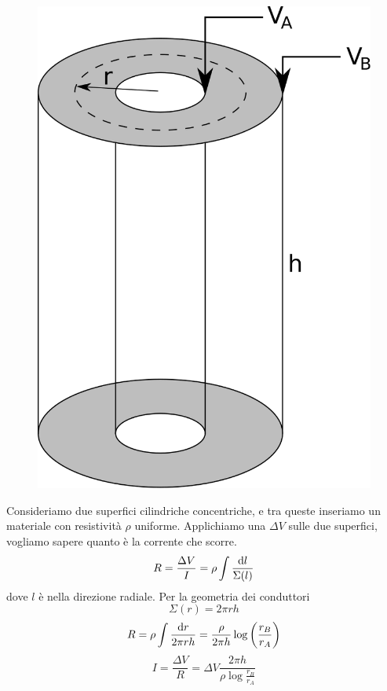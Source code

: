 \begin{Es}
  \begin{figure}[htbp]
    \centering
    \includegraphics[scale=0.35]{immagini/fisica2/conduttore_cilindrico}
  \end{figure}
  Consideriamo due superfici cilindriche concentriche, e tra queste inseriamo un materiale con resistività $\rho$ uniforme. Applichiamo una $\Delta V$ sulle due superfici, vogliamo sapere quanto è la corrente che scorre.
  \[
    R = \frac{\Delta V}{I} = \rho\int\frac{\mathrm{d} l}{\Sigma(l)}
  \]
  dove $l$ è nella direzione radiale. Per la geometria dei conduttori
  \[
    \Sigma(r) = 2\pi rh
  \]
  \[
    R = \rho\int\frac{\mathrm{d} r}{2\pi rh}=\frac{\rho}{2\pi h}\log\left(\frac{r_B}{r_A}\right)
  \]
  \[
    I = \frac{\Delta V}{R} = \Delta V \frac{2\pi h}{\rho\log\frac{r_B}{r_A}}
  \]
\end{Es}


